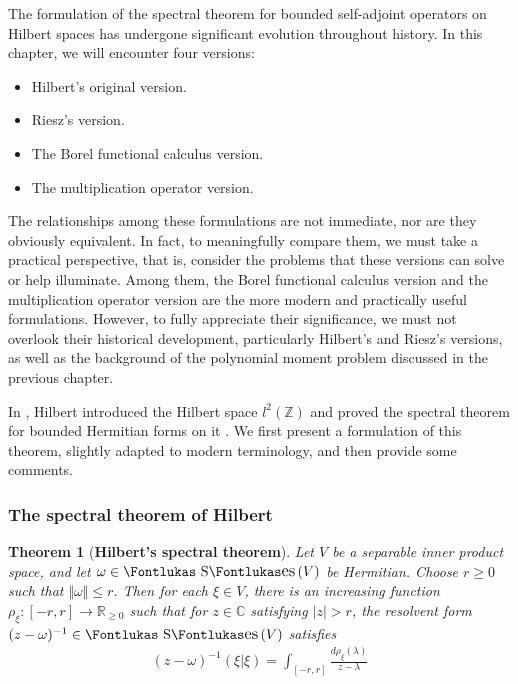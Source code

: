 \documentclass[12pt,b5paper,notitlepage]{article}
\theoremstyle{definition}
\theoremstyle{plain}
\newtheorem{thm}[df]{Theorem}
\DeclareMathOperator{\Ses}{\text{\Fontlukas S}\text{\kern -0pt {\Fontlukas\large es}}\,}
\newcommand{\Cbb}{\mathbb C}
\newcommand{\Zbb}{\mathbb Z}
\newcommand{\Rbb}{\mathbb R}
\numberwithin{equation}{section}
\begin{document}
The formulation of the spectral theorem for bounded self-adjoint operators on Hilbert spaces has undergone significant evolution throughout history. In this chapter, we will encounter four versions: 
\begin{itemize}
\item Hilbert's original version.
\item Riesz's version.
\item The Borel functional calculus version.
\item The multiplication operator version.
\end{itemize}
The relationships among these formulations are not immediate, nor are they obviously equivalent. In fact, to meaningfully compare them, we must take a practical perspective, that is, consider the problems that these versions can solve or help illuminate. Among them, the Borel functional calculus version and the multiplication operator version are the more modern and practically useful formulations. However, to fully appreciate their significance, we must not overlook their historical development, particularly Hilbert's and Riesz's versions, as well as the background of the polynomial moment problem discussed in the previous chapter.




In \cite{Hil06}, Hilbert introduced the Hilbert space $l^2(\Zbb)$ and proved the spectral theorem for bounded Hermitian forms on it \cite[Satz 31]{Hil06}. We first present a formulation of this theorem, slightly adapted to modern terminology, and then provide some comments.


\subsubsection{The spectral theorem of Hilbert}

\begin{thm}[\textbf{Hilbert's spectral theorem}]\label{lb239} 
Let $V$ be a separable inner product space, and let $\omega\in\Ses(V)$ be Hermitian. Choose $r\geq0$ such that $\Vert\omega\Vert\leq r$. Then for each $\xi\in V$, there is an increasing function $\rho_\xi:[-r,r]\rightarrow\Rbb_{\geq0}$ such that for $z\in\Cbb$ satisfying $|z|>r$, the resolvent form $(z-\omega)^{-1}\in\Ses(V)$ satisfies
\begin{align}\label{eq132}
(z-\omega)^{-1}(\xi|\xi)=\int_{[-r,r]}\frac{d\rho_\xi(\lambda)}{z-\lambda}
\end{align}
\end{thm}
\end{document}
